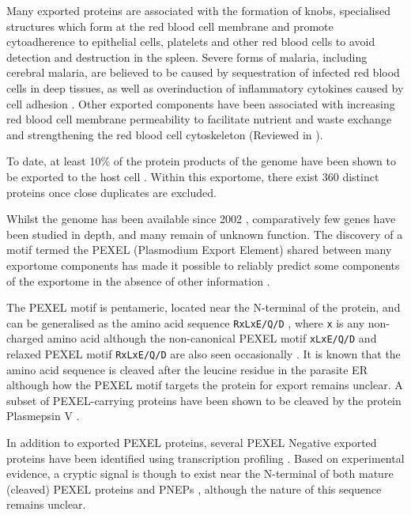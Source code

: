 \documentclass[fleqn,10pt]{article} %
\begin{document}
Many exported proteins are associated with the formation of knobs, specialised structures which form at the red blood cell membrane and promote cytoadherence to epithelial cells, platelets and other red blood cells \cite{Kraemer2006} to avoid detection and destruction in the spleen. Severe forms of malaria, including cerebral malaria, are believed to be caused by sequestration of infected red blood cells in deep tissues, as well as overinduction of inflammatory cytokines caused by cell adhesion \cite{Chen2000}. Other exported components have been associated with increasing red blood cell membrane permeability to facilitate nutrient and waste exchange and strengthening the red blood cell cytoskeleton (Reviewed in \cite{Elsworth2014}). 

To date, at least 10\% of the protein products of the \pf genome have been shown to be exported to the host cell \cite{Boddey2013a}. Within this exportome, there exist 360 distinct proteins once close duplicates are excluded.

Whilst the \pf genome has been available since 2002 \cite{Gardner2002}, comparatively few genes have been studied in depth, and many remain of unknown function. The discovery of a motif termed the PEXEL (Plasmodium Export Element) shared between many exportome components has made it possible to reliably predict some components of the \pf exportome in the absence of other information \cite{Sargeant2006}.

The PEXEL motif is pentameric, located near the N-terminal of the protein, and can be generalised as the amino acid sequence \texttt{RxLxE/Q/D} \cite{Goldberg2010}, where \texttt{x} is any non-charged amino acid \cite{Dietz2014} although the non-canonical PEXEL motif \texttt{xLxE/Q/D} and relaxed PEXEL motif \texttt{RxLxE/Q/D} are also seen occasionally \cite{Elsworth2014}. It is known that the amino acid sequence is cleaved after the leucine residue in the parasite ER \cite{Goldberg2010} although how the PEXEL motif targets the protein for export remains unclear. A subset of PEXEL-carrying proteins have been shown to be cleaved by the \pf protein Plasmepsin V \cite{Boddey2013}.


In addition to exported PEXEL proteins, several PEXEL Negative exported proteins have been identified using transcription profiling \cite{Heiber2013}. Based on experimental evidence, a cryptic signal is though to exist near the N-terminal of both mature (cleaved) PEXEL proteins and PNEPs \cite{Gruring2012}, although the nature of this sequence remains unclear.
\end{document}
